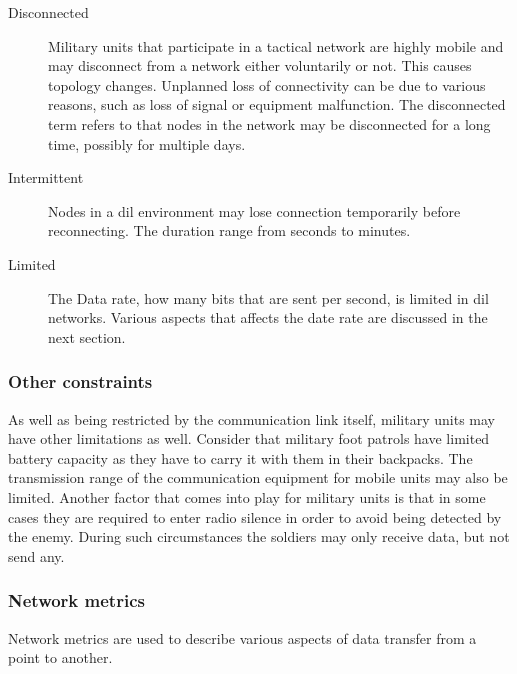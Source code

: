\begin{description}
\item[Disconnected]
Military units that participate in a tactical network are highly mobile
and may disconnect from a network either voluntarily or not. This causes
topology changes. Unplanned loss of connectivity can be due to various reasons,
such as loss of signal or equipment malfunction.  The disconnected term refers
to that nodes in the network may be disconnected for a long time, possibly for
multiple days.

\item[Intermittent]

Nodes in a \gls{dil} environment may lose connection temporarily before
reconnecting. The duration range from seconds to minutes.

\item[Limited] The Data rate, how many bits that are sent per second, is limited
in \gls{dil} networks. Various aspects that affects the date rate are discussed
in the next section.

\end{description}

\subsubsection{Other constraints}

As well as being restricted  by the communication link itself, military units
may have other limitations as well. Consider that military foot patrols have
limited battery capacity as they have to carry it with them in their
backpacks. The transmission range of the communication equipment for mobile
units may also be limited. Another factor that comes into play for military
units is that in some cases they are required to enter radio silence in order
to avoid being detected by the enemy. During such circumstances the soldiers
may only receive data, but not send any.


\subsubsection{Network metrics}

Network metrics are used to describe various aspects of data transfer from a
point to another.

